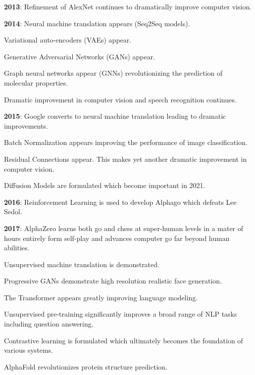 {\vfill
{\bf 2013}: Refinement of AlexNet continues to dramatically improve computer vision.


{\bf 2014}: Neural machine translation appears (Seq2Seq models).

\vfill
{\color{red} Variational auto-encoders} (VAEs) appear.

\vfill
{\color{red} Generative Adversarial Networks} (GANs) appear.

\vfill
{\color{red} Graph neural networks appear} (GNNs) revolutionizing the prediction of molecular properties.

\vfill
Dramatic improvement in computer vision and speech recognition continues.


{\bf 2015}: Google converts to neural machine translation leading to dramatic improvements.

\vfill
{\color{red} Batch Normalization} appears improving the performance of image classification.

\vfill
{{\color{red} Residual Connections} appear.  This makes yet another dramatic improvement in computer vision.

\vfill
{\color{red} Diffusion Models} are formulated which become important in 2021.

\vfill
{\bf 2016}: {\color{red} Reinforcement Learning} is used to develop Alphago which defeats Lee Sedol.


{\bf 2017}: AlphaZero learns both go and chess at super-human levels in a mater of hours entirely form self-play and advances computer go far beyond human abilities.

\vfill
Unsupervised machine translation is demonstrated.

\vfill
Progressive GANs demonstrate high resolution realistic face generation.

\vfill
The {\color{red} Transformer} appears greatly improving language modeling.


{\color{red} Unsupervised pre-training} significantly improves a broad range of NLP tasks including question answering.

\vfill

{\color{red} Contrastive learning} is formulated which ultimately becomes the foundation of various systems.

\vfill
AlphaFold revolutionizes protein structure prediction.

}}
